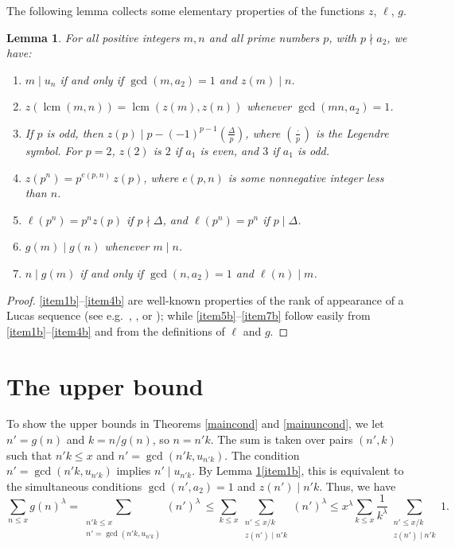 \documentclass[12pt,a4paper,oneside]{amsart}
\newtheorem{lemma}[theorem]{Lemma}
\newcommand{\lcm}{\operatorname{lcm}}
\begin{document}
The following lemma collects some elementary properties of the functions $z$, $\ell$, $g$.

\begin{lemma}\label{lem:basic}
For all positive integers $m,n$ and all prime numbers $p$, with $p \nmid a_2$, we have:
\begin{enumerate}[label={\rm (\roman{*})},itemsep=0.5em]
\item \label{item1b} $m \mid u_n$ if and only if $\gcd(m, a_2) = 1$ and $z(m) \mid n$.
\item \label{item2b} $z(\lcm(m,n))=\lcm(z(m),z(n))$ whenever $\gcd(mn, a_2) = 1$.

\item \label{item3b} If $p$ is odd, then $z(p)\mid p - (-1)^{p-1}\left(\frac{\Delta}{p}\right)$, where $\left(\frac{\cdot}{p}\right)$ is the Legendre symbol. For $p=2$, $z(2)$ is $2$ if $a_1$ is even, and $3$ if $a_1$ is odd.
\item \label{item4b} $z(p^n)=p^{e(p, n)}\,z(p)$, where $e(p, n)$ is some nonnegative integer less than $n$.
\item \label{item5b} $\ell(p^n) = p^n z(p)$ if $p \nmid \Delta$, and $\ell(p^n) = p^n$ if $p \mid \Delta$.
\item \label{item6b} $g(m) \mid g(n)$ whenever $m \mid n$.
\item \label{item7b} $n \mid g(m)$ if and only if $\gcd(n, a_2) = 1$ and $\ell(n) \mid m$.
\end{enumerate}
\end{lemma}
\begin{proof}
\ref{item1b}--\ref{item4b} are well-known properties of the rank of appearance of a Lucas sequence (see e.g.~\cite{Re13}, \cite[Ch.~1]{Ri00}, or \cite[\S2]{Sa17}); while \ref{item5b}--\ref{item7b} follow easily from \ref{item1b}--\ref{item4b} and from the definitions of $\ell$ and $g$.
\end{proof}


\section{The upper bound}\label{upperbound}

To show the upper bounds in Theorems \ref{maincond} and \ref{mainuncond}, we let $n' = g(n)$ and $k=n/g(n)$, so $n=n'k$. The sum is taken over pairs $(n',k)$ such that $n'k \le x$ and $n' = \gcd(n'k, u_{n'k})$.
The condition $n' = \gcd(n'k, u_{n'k})$ implies $n' \mid u_{n'k}$. By Lemma \ref{lem:basic}\ref{item1b}, this is equivalent to the simultaneous conditions $\gcd(n',a_2)=1$ and  $z(n') \mid n'k$.
Thus, we have
\[ \sum_{n \leq x} g(n)^\lambda = \sum_{\substack{n'k \leq x \\ n' = \gcd(n'k, u_{n'k})}} (n')^\lambda \,\leq \sum_{k \leq x} \sum_{\substack{n' \leq x/k \\ z(n') \mid n'k}} (n')^\lambda\leq x^\lambda \sum_{k \leq x} \frac{1}{k^\lambda} \sum_{\substack{n' \leq x/k \\ z(n')\mid n'k}}1. \]
\end{document}
